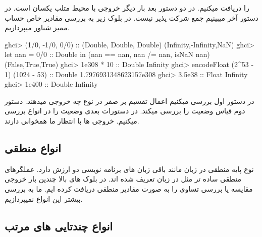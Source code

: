 را دریافت میکنیم. در دو دستور بعد بار دیگر خروجی با محیط متلب یکسان است. در دستور آخر میبینیم جمع شرکت پذیر نیست.
\newline
در بلوک زیر به بررسی مقادیر خاص حساب ممیز شناور میپردازیم.
\begin{latin}
\begin{ghcode}
ghci> (1/0, -1/0, 0/0) :: (Double, Double, Double)
(Infinity,-Infinity,NaN)
ghci> let nan = 0/0 :: Double in (nan == nan, nan /= nan, isNaN nan)
(False,True,True)
ghci> 1e308 * 10 :: Double
Infinity
ghci> encodeFloat (2^53 - 1) (1024 - 53) :: Double
1.7976931348623157e308
ghci> 3.5e38 :: Float
Infinity
ghci> 1e400 :: Double
Infinity
\end{ghcode}
\end{latin}
در دستور اول بررسی میکنیم اعمال تقسیم بر صفر در نوع 
چه خروجی میدهند. دستور دوم قیاس وضعیت 
را بررسی میکند. در دستورات بعدی وضعیت 
را در انواع 
بررسی میکنیم. خروجی ها با انتظار ما همخوانی دارند. 


\subsection{
انواع منطقی
}
نوع پایه منطقی در زبان 
مانند باقی زبان های برنامه نویسی دو ارزش 
دارد. عملگرهای منطقی ساده تر مثل 
در زبان تعریف شده اند. در بلوک های بالا چندین بار خروجی مقایسه یا بررسی تساوی را به صورت مقادیر منطقی دریافت کرده ایم. ما به بررسی بیشتر این انواع نمیپردازیم.
\subsection{
انواع چندتایی های مرتب
}
